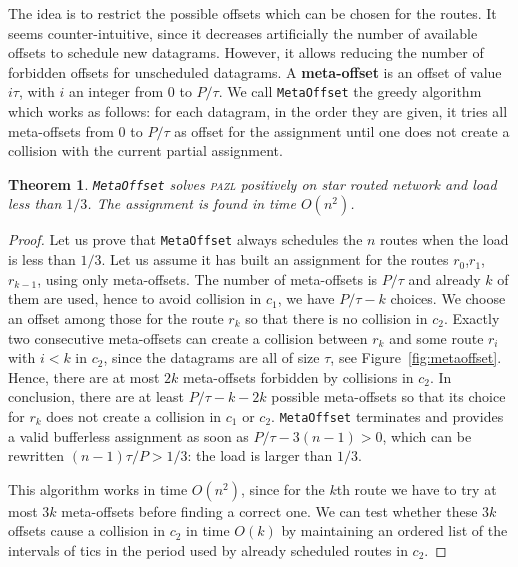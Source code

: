 \documentclass[a4paper,10pt]{journal}
\newcommand\metaoffset{\texttt{MetaOffset}\xspace}
\newtheorem{theorem}{Theorem}
\newcommand\pazl{\textsc{pazl}\xspace}
\begin{document}
     The idea is to restrict the possible offsets which can be chosen for the routes. It seems counter-intuitive, since it decreases artificially the number of available offsets to schedule new datagrams. However, it allows reducing the number of forbidden offsets for unscheduled datagrams. A \textbf{meta-offset} is an offset of value $i\tau$, with $i$ an integer from $0$ to $P / \tau$. We call \metaoffset the greedy algorithm which works as follows: for each datagram, in the order they are given, it tries all meta-offsets from $0$ to $P/\tau$ as offset for the assignment until one does not create a collision with the current partial assignment. 


    \begin{theorem}
    \metaoffset solves \pazl positively on star routed network and load less than $1/3$. 
    The assignment is found in time $O(n^2)$.
    \end{theorem}
    \begin{proof}
    Let us prove that \metaoffset always schedules the $n$ routes when the load is less than $1/3$. Let us assume it has built an assignment for the routes $r_0$,$r_1$, $r_{k-1}$, using only meta-offsets. The number of meta-offsets is $P/\tau$ and already $k$ of them are used, hence to avoid collision in $c_1$, we have $P/\tau - k$ choices. We choose an offset among those for the route $r_k$ so that there is no collision in $c_2$. Exactly two consecutive meta-offsets can create a collision between $r_k$ and some route $r_i$ with $i < k$ in $c_2$, since the datagrams are all of size $\tau$, see Figure~\ref{fig:metaoffset}. Hence, there are at most $2k$ meta-offsets forbidden by collisions in $c_2$. In conclusion, there are at least $P/\tau - k - 2k$ possible meta-offsets so that its choice for $r_k$ does not create a collision in $c_1$ or $c_2$.  \metaoffset terminates and provides a valid bufferless assignment as soon as $P/\tau - 3(n-1) > 0$, which can be rewritten $(n-1)\tau /P > 1/3$: the load is larger than $1/3$.

     This algorithm works in time $O(n^2)$, since for the $k$th route we have to try at most $3k$ meta-offsets before finding a correct one. We can test whether these $3k$ offsets cause a collision in $c_2$ in time $O(k)$ by maintaining an ordered list of the intervals of tics in the period used by already scheduled routes in $c_2$.
     \end{proof}
         
\end{document}

